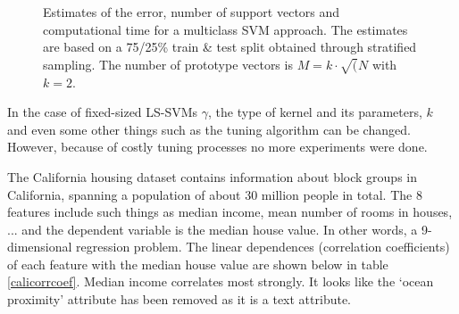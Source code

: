 \begin{figure}[!htb]
\centering
\begin{minipage}{\textwidth}
        \centering
        \hfil
	\hfil
	\hfil
\end{minipage}
\caption{Estimates of the error, number of support vectors and computational time for a multiclass SVM approach. The estimates are based on a 75/25\% train \& test split obtained through stratified sampling. The number of prototype vectors is $M=k\cdot\sqrt({N}$ with $k=2$.}
\label{shuttlemultiestimates}
\end{figure}

In the case of fixed-sized LS-SVMs $\gamma$, the type of kernel and its parameters, $k$ and even some other things such as the tuning algorithm can be changed. However, because of costly tuning processes no more experiments were done. 


The California housing dataset contains information about block groups in California, spanning a population of about 30 million people in total. The 8 features include such things as median income, mean number of rooms in houses, ... and the dependent variable is the median house value. In other words, a 9-dimensional regression problem. The linear dependences (correlation coefficients) of each feature with the median house value are shown below in table \ref{calicorrcoef}. Median income correlates most strongly. It looks like the `ocean proximity' attribute has been removed as it is a text attribute.

